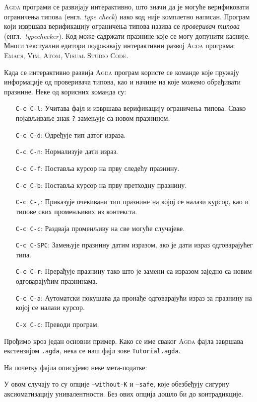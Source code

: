 \textsc{Agda} програми се развијају интерактивно, што значи да је могуће верификовати ограничења типовa (енгл. \emph{type check}) иако код није комплетно написан. Програм који извршава верификацију ограничења типова назива се \emph{проверивач типова} (енгл.~\emph{typechecker}). Код може садржати празнине које се могу допунити касније. Многи текстуални едитори подржавају интерактивни развој \textsc{Agda} програма: \textsc{Emacs}, \textsc{Vim}, \textsc{Atom}, \textsc{Visual Studio Code}.

Када се интерактивно развија \textsc{Agda} програм користе се команде које пружају информације од проверивача типова, као и начине на које можемо обрађивати празнине. Неке од корисних команда су:

\begin{itemize}
    \item[\texttt{C-c C-l}:]{Учитава фајл и извршава верификацију ограничења типова. Свако појављивање знак \texttt{?} замењује са новом празнином.}
    \item[\texttt{C-c C-d}:]{Одређује тип датог израза.}
    \item[\texttt{C-c C-n}:]{Нормализује дати израз.}
    \item[\texttt{C-c C-f}:]{Поставља курсор на прву следећу празнину.}
    \item[\texttt{C-c C-b}:]{Поставља курсор на прву претходну празнину.}
    \item[\texttt{C-c C-,}:]{Приказује очекивани тип празнине на којој се налази курсор, као и типове свих променљивих из контекста.}
    \item[\texttt{C-c C-c}:]{Раздваја променљиву на све могуће случајеве.}
    \item[\texttt{C-c C-SPC}:]{Замењује празнину датим изразом, ако је дати израз одговарајућег типа.}
    \item[\texttt{C-c C-r}:]{Прерађује празнину тако што је замени са изразом заједно са новим одговарајућим празнинама.}
    \item[\texttt{C-c C-a}:]{Аутоматски покушава да пронађе одговарајући израз за празнину на којој се налази курсор.}
    \item[\texttt{C-x C-c}:]{Преводи програм.}
\end{itemize}

Прођимо кроз један основни пример. Како се име сваког \textsc{Agda} фајла завршава екстензијом \texttt{.agda}, нека се наш фајл зове \texttt{Tutorial.agda}.

На почетку фајла описујемо неке мета-податке:
\begin{code}%
\>[0]\AgdaSymbol{\{-\#}\AgdaSpace{}%
\AgdaSpace{}%
\AgdaSpace{}%
\AgdaSpace{}%
\AgdaSymbol{\#-\}}\<%
\end{code}
У овом случају то су опције \texttt{--without-K} и \texttt{--safe}, које обезбеђују сигурну аксиоматизацију унивалентности. Без ових опција дошло би до контрадикције.

